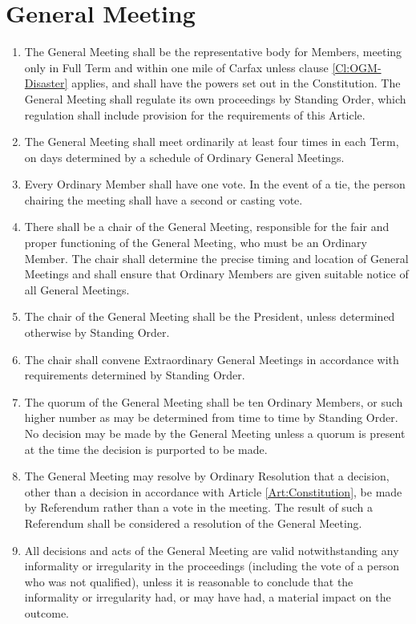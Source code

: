 \documentclass[11pt,a4paper, oneside]{memoir}
\begin{document}
	\section{General Meeting} \label{Art:GeneralMeeting}
	\begin{enumerate}
		\item The General Meeting shall be the representative body for Members, meeting only in Full Term and within one mile of Carfax unless clause \ref{Cl:OGM-Disaster} applies, and shall have the powers set out in the Constitution.
		The General Meeting shall regulate its own proceedings by Standing Order, which regulation shall include provision for the requirements of this Article.
		\item \label{Cl:OGM} The General Meeting shall meet ordinarily at least four times in each Term, on days determined by a schedule of Ordinary General Meetings.
		\item Every Ordinary Member shall have one vote.
		In the event of a tie, the person chairing the meeting shall have a second or casting vote.
		\item There shall be a chair of the General Meeting, responsible for the fair and proper functioning of the General Meeting, who must be an Ordinary Member.
		The chair shall determine the precise timing and location of General Meetings and shall ensure that Ordinary Members are given suitable notice of all General Meetings.
		\item The chair of the General Meeting shall be the President, unless determined otherwise by Standing Order.
		\item The chair shall convene Extraordinary General Meetings in accordance with requirements determined by Standing Order.
		\item The quorum of the General Meeting shall be ten Ordinary Members, or such higher number as may be determined from time to time by Standing Order.
		No decision may be made by the General Meeting unless a quorum is present at the time the decision is purported to be made.
		\item The General Meeting may resolve by Ordinary Resolution that a decision, other than a decision in accordance with Article \ref{Art:Constitution}, be made by Referendum rather than a vote in the meeting.
		The result of such a Referendum shall be considered a resolution of the General Meeting.
		\item All decisions and acts of the General Meeting are valid notwithstanding any informality or irregularity in the proceedings (including the vote of a person who was not qualified), unless it is reasonable to conclude that the informality or irregularity had, or may have had, a material impact on the outcome.

\end{enumerate}
\end{document}
